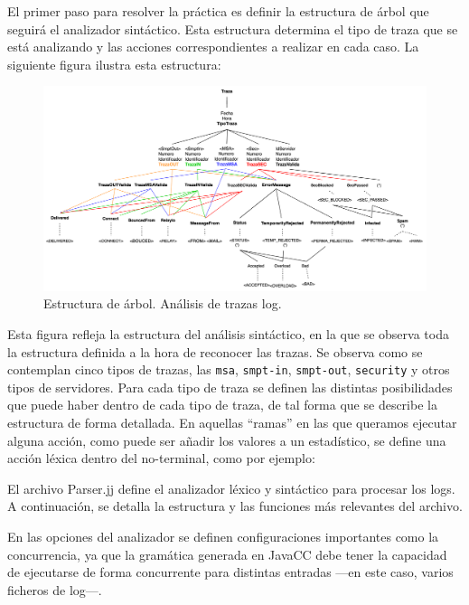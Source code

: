 El primer paso para resolver la práctica es definir la estructura de árbol que seguirá el analizador sintáctico. Esta estructura determina el tipo de traza que se está analizando y las acciones correspondientes a realizar en cada caso. La siguiente figura ilustra esta estructura:

\begin{figure}[H]
    \centering
    \includegraphics[width=\textwidth]{imagenes/arboltraza.png}
    \caption{Estructura de árbol. Análisis de trazas log.}
    \label{fig:arboltraza}
\end{figure}

Esta figura refleja la estructura del análisis sintáctico, en la que se observa toda la estructura definida a la hora de reconocer las trazas. Se observa como se contemplan cinco tipos de trazas, las \lstinline|msa|, \lstinline|smpt-in|, \lstinline|smpt-out|, \lstinline|security| y otros tipos de servidores. Para cada tipo de traza se definen las distintas posibilidades que puede haber dentro de cada tipo de traza, de tal forma que se describe la estructura de forma detallada. En aquellas ``ramas'' en las que queramos ejecutar alguna acción, como puede ser añadir los valores a un estadístico, se define una acción léxica dentro del no-terminal, como por ejemplo:

\lstset{inputencoding=utf8/latin1}


El archivo Parser.jj define el analizador léxico y sintáctico para procesar los logs. A continuación, se detalla la estructura y las funciones más relevantes del archivo.

En las opciones del analizador se definen configuraciones importantes como la concurrencia, ya que la gramática generada en JavaCC debe tener la capacidad de ejecutarse de forma concurrente para distintas entradas ---en este caso, varios ficheros de log---.

